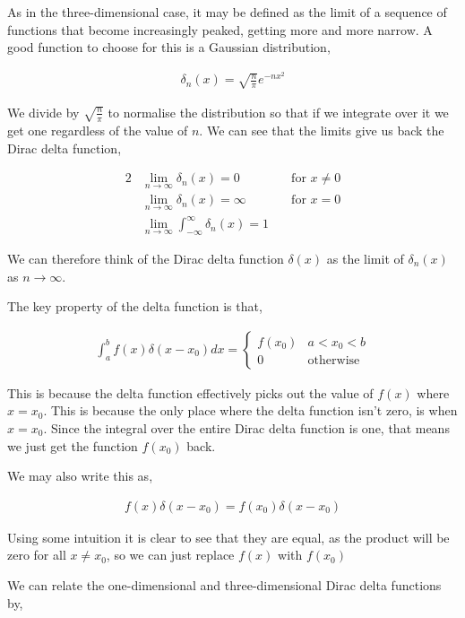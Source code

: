 \documentclass[11pt]{amsart}
\begin{document}
As in the three-dimensional case, it may be defined as the limit of a sequence of functions that become increasingly peaked, getting more and more narrow. A good function to choose for this is a Gaussian distribution,

\begin{align*}
  \delta_n(x) = \sqrt{\frac{n}{\pi}} e^{-nx^2}
\end{align*}

We divide by $\sqrt{\frac{n}{\pi}}$ to normalise the distribution so that if we integrate over it we get one regardless of the value of $n$. We can see that the limits give us back the Dirac delta function,

\begin{alignat*}{2}
  &\lim_{n \to \infty} \delta_n(x) = 0 \qquad &&\text{for } x\neq0 \\
  &\lim_{n \to \infty} \delta_n(x) = \infty \qquad &&\text{for } x = 0 \\
  &\lim_{n \to \infty} \int_{-\infty}^{\infty} \delta_n(x) = 1
\end{alignat*}

We can therefore think of the Dirac delta function $\delta(x)$ as the limit of $\delta_n(x)$ as $n \to \infty$.

The key property of the delta function is that,

\begin{align*}
  \int_a^b f(x) \delta(x - x_0) dx =
  \begin{cases}
    f(x_0) & a < x_0 < b \\
    0 & \text{otherwise}
  \end{cases}
\end{align*}

This is because the delta function effectively picks out the value of $f(x)$ where $x = x_0$. This is because the only place where the delta function isn't zero, is when $x = x_0$. Since the integral over the entire Dirac delta function is one, that means we just get the function $f(x_0)$ back.

We may also write this as,

\begin{align*}
  f(x)\delta(x - x_0) = f(x_0)\delta(x - x_0)
\end{align*}

Using some intuition it is clear to see that they are equal, as the product will be zero for all $x \neq x_0$, so we can just replace $f(x)$ with $f(x_0)$

We can relate the one-dimensional and three-dimensional Dirac delta functions by,
\end{document}
